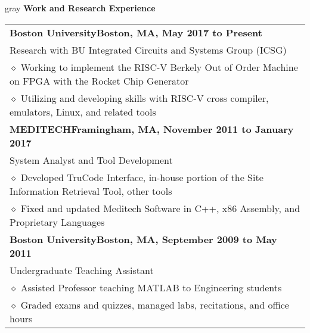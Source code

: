 \documentclass[10.5pt,letterpaper]{article}
\newcommand{\org}[1]{\textbf{#1}}
\newcommand{\pseudoitem}{\diamond}
\newcommand{\vertspace}{\vspace{1.2mm}}
\newcommand{\horzindent}{\hspace{3mm}}
\newcommand{\minorindent}{\hspace{4.5mm}}
\newcommand{\minoritem}{\minorindent $\pseudoitem$ }
\newcommand{\tablewidth}{.9\linewidth}
\newcommand{\undergrad}{Boston University}
\newcommand{\grad}{Boston University}
\begin{document}
	\fi
			
	\vertspace
	\noindent
	\begin{heading}{gray}
		\textbf{Work and Research Experience} 
	\end{heading}
		\begin{tabular*}{\tablewidth}{@{\extracolsep{\fill}}l}
			\org{\grad}\hfill \textbf{Boston, MA, May 2017 to Present}\\
			\horzindent Research with BU Integrated Circuits and Systems Group (ICSG)\\
			\minoritem Working to implement the RISC-V Berkely Out of Order Machine on FPGA with the Rocket Chip Generator\\
			\minoritem Utilizing and developing skills with RISC-V cross compiler, emulators, Linux, and related tools\\
			\org{MEDITECH}\hfill \textbf{Framingham, MA, November 2011 to January 2017}\\
			\horzindent System Analyst and Tool Development \\
			\minoritem Developed TruCode Interface, in-house portion of the Site Information Retrieval Tool, other tools \\
			\minoritem Fixed and updated Meditech Software in C++, x86 Assembly, and Proprietary Languages \\
			\org{\undergrad}\hfill \textbf{Boston, MA, September 2009 to May 2011}\\
			\horzindent Undergraduate Teaching Assistant \\
			\minoritem Assisted Professor teaching MATLAB to Engineering students \\
			\minoritem Graded exams and quizzes, managed labs, recitations, and office hours \\
		\end{tabular*}
	
\end{document}

